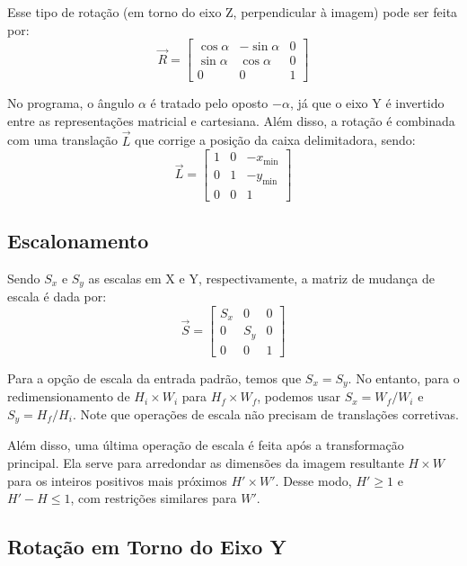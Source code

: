     Esse tipo de rotação (em torno do eixo Z, perpendicular à imagem) pode ser feita por:
    \[
        \vec{R} = \begin{bmatrix}
            \cos\alpha & -\sin\alpha & 0 \\
            \sin\alpha & \cos\alpha & 0 \\
            0 & 0 & 1
        \end{bmatrix}
    \]

    No programa, o ângulo $\alpha$ é tratado pelo oposto $-\alpha$, já que o eixo Y é invertido entre as representações matricial e cartesiana. Além disso, a rotação é combinada com uma translação $\vec{L}$ que corrige a posição da caixa delimitadora, sendo:
    \[
        \vec{L} = \begin{bmatrix}
            1 & 0 & -x_{\min} \\
            0 & 1 & -y_{\min} \\
            0 & 0 & 1
        \end{bmatrix}
    \]

\subsection{Escalonamento}

    Sendo $S_x$ e $S_y$ as escalas em X e Y, respectivamente, a matriz de mudança de escala é dada por:
    \[
        \vec{S} = \begin{bmatrix}
            S_x & 0 & 0 \\
            0 & S_y & 0 \\
            0 & 0 & 1
        \end{bmatrix}
    \]

    Para a opção de escala da entrada padrão, temos que $S_x = S_y$. No entanto, para o redimensionamento de $H_i \times W_i$ para $H_f \times W_f$, podemos usar $S_x = W_f / W_i$ e $S_y = H_f / H_i$. Note que operações de escala não precisam de translações corretivas.

    Além disso, uma última operação de escala é feita após a transformação principal. Ela serve para arredondar as dimensões da imagem resultante $H \times W$ para os inteiros positivos mais próximos $H' \times W'$. Desse modo, $H' \geq 1$ e $H' - H \leq 1$, com restrições similares para $W'$.

\subsection{Rotação em Torno do Eixo Y} \label{sec:rotacaoXY}

